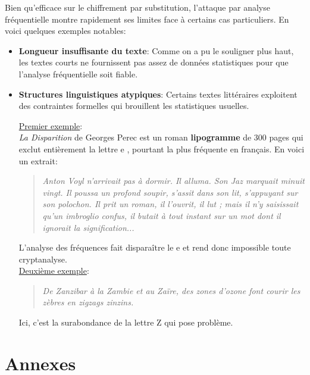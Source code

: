 \documentclass[a4paper]{article}
\begin{document}
Bien qu'efficace sur le chiffrement par substitution, l'attaque par analyse fréquentielle montre rapidement ses limites face à certains cas particuliers. En voici quelques exemples notables:
\begin{itemize}
    \item \textbf{Longueur insuffisante du texte}: Comme on a pu le souligner plus haut, les textes courts ne fournissent pas assez de données statistiques pour que l'analyse fréquentielle soit fiable.
    \item \textbf{Structures linguistiques atypiques}: Certains textes littéraires exploitent des contraintes formelles qui brouillent les statistiques usuelles. 

    \underline{Premier exemple}:\\

    \textit{La Disparition} de Georges Perec est un roman \textbf{lipogramme} de 300 pages qui exclut entièrement la lettre \og e \fg{}, pourtant la plus fréquente en français. En voici un extrait:

    \begin{quote}
        \textit{Anton Voyl n’arrivait pas à dormir. Il alluma. Son Jaz marquait minuit vingt. Il poussa un profond soupir, s’assit dans son lit, s’appuyant sur son polochon. Il prit un roman, il l’ouvrit, il lut ; mais il n’y saisissait qu’un imbroglio confus, il butait à tout instant sur un mot dont il ignorait la signification...}
    \end{quote}

    L’analyse des fréquences fait disparaître le \og e \fg{} et rend donc impossible toute cryptanalyse.\\

    \underline{Deuxième exemple}:

    \begin{quote}
        \textit{De Zanzibar à la Zambie et au Zaïre, des zones d’ozone font courir les zèbres en zigzags zinzins.}
    \end{quote}

    Ici, c’est la surabondance de la lettre \og Z \fg{} qui pose problème.


\end{itemize}


\clearpage
\section*{Annexes}
\end{document}
